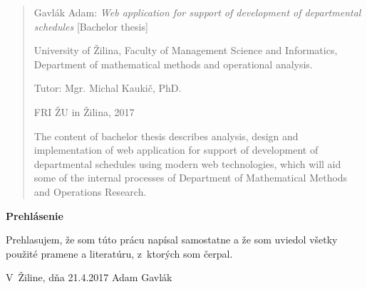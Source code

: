 

\begin{abstract}

\noindent
{\sc Gavlák Adam:} {\em Web application for support of development of departmental schedules}
[Bachelor thesis] 

\noindent
University of Žilina,  
Faculty of Management Science and Informatics, 
Department of mathematical methods and operational analysis.
 
\noindent
Tutor:  Mgr. Michal Kaukič, PhD.

\noindent
FRI ŽU in Žilina, 2017

\bigskip

The content of bachelor thesis describes analysis, design and implementation of web application for support of development of departmental schedules using modern web technologies, which will aid some of the internal processes of Department of Mathematical Methods and Operations Research.

\end{abstract}


\newpage

\centerline{\bf Prehlásenie}

\vspace{2em}

\noindent
Prehlasujem, že som túto prácu napísal samostatne a že som uviedol 
všetky použité pramene a literatúru, z~ktorých som čerpal. 

\vspace{2em}

\noindent
V~Žiline, dňa 21.4.2017
\hfill
Adam Gavlák

